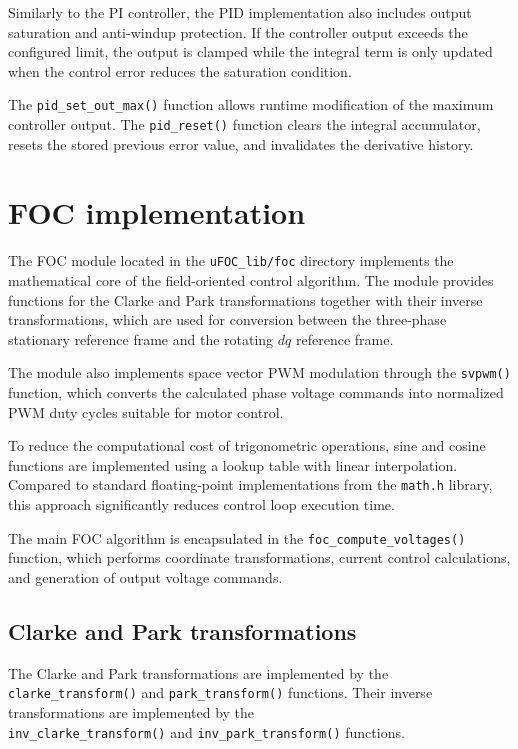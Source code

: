 Similarly to the PI controller, the PID implementation also includes output saturation and anti-windup protection.
If the controller output exceeds the configured limit, the output is clamped while the integral term 
is only updated when the control error reduces the saturation condition.

The \texttt{pid\_set\_out\_max()} function allows runtime modification of the maximum controller output.
The \texttt{pid\_reset()} function clears the integral accumulator, resets the stored previous error value, and invalidates the derivative history.



\section{FOC implementation}
The FOC module located in the \texttt{uFOC\_lib/foc} directory implements the mathematical core of the field-oriented control algorithm.
The module provides functions for the Clarke and Park transformations together with their inverse transformations,
which are used for conversion between the three-phase stationary reference frame and the rotating $dq$ reference frame.

The module also implements space vector PWM modulation through the \texttt{svpwm()} function,
which converts the calculated phase voltage commands into normalized PWM duty cycles suitable for motor control.

To reduce the computational cost of trigonometric operations, sine and cosine functions are implemented using a lookup table with linear interpolation. \cite{TrigonometricFuncitonOptimization}
Compared to standard floating-point implementations from the \texttt{math.h} library, this approach significantly reduces control loop execution time.

The main FOC algorithm is encapsulated in the \texttt{foc\_compute\_voltages()} function,
which performs coordinate transformations, current control calculations, and generation of output voltage commands.

\subsection{Clarke and Park transformations}
The Clarke and Park transformations are implemented by the \texttt{clarke\_transform()} and \texttt{park\_transform()} functions.
Their inverse transformations are implemented by the\\ \texttt{inv\_clarke\_transform()} and \texttt{inv\_park\_transform()} functions.

